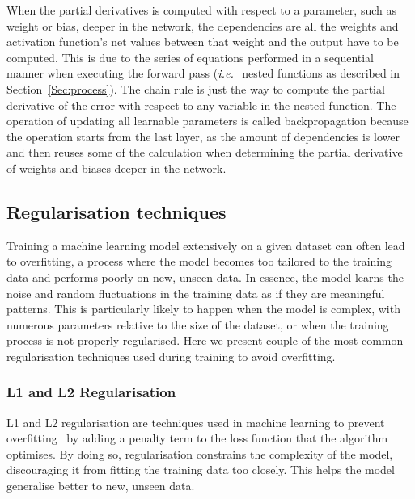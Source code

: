 When the partial derivatives is computed with respect to a parameter, such as weight or bias, deeper in the network, the dependencies are all the weights and activation function's net values between that weight and the output have to be computed. This is due to the series of equations performed in a sequential manner when executing the forward pass ($\textit{i.e.}\ $ nested functions as described in Section~\ref{Sec:process}). The chain rule is just the way to compute the partial derivative of the error with respect to any variable in the nested function. The operation of updating all learnable parameters is called backpropagation because the operation starts from the last layer, as the amount of dependencies is lower and then reuses some of the calculation when determining the partial derivative of weights and biases deeper in the network. 



\subsection{Regularisation techniques}
Training a machine learning model extensively on a given dataset can often lead to overfitting, a process where the model becomes too tailored to the training data and performs poorly on new, unseen data. In essence, the model learns the noise and random fluctuations in the training data as if they are meaningful patterns. This is particularly likely to happen when the model is complex, with numerous parameters relative to the size of the dataset, or when the training process is not properly regularised. Here we present couple of the most common regularisation techniques used during training to avoid overfitting.

\subsubsection{L1 and L2 Regularisation}
L1 and L2 regularisation are techniques used in machine learning to prevent overfitting~\cite{ng2004feature} by adding a penalty term to the loss function that the algorithm optimises. By doing so, regularisation constrains the complexity of the model, discouraging it from fitting the training data too closely. This helps the model generalise better to new, unseen data.

